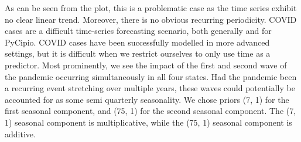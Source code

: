 \documentclass{article}
\begin{document}
\noindent As can be seen from the plot, this is a problematic case as the time series exhibit no clear linear trend. Moreover, there is no obvious recurring periodicity. COVID cases are a difficult time-series forecasting scenario, both generally and for PyCipio. COVID cases have been successfully modelled in more advanced settings, but it is difficult when we restrict ourselves to only use time as a predictor. Most prominently, we see the impact of the first and second wave of the pandemic occurring simultaneously in all four states. Had the pandemic been a recurring event stretching over multiple years, these waves could potentially be accounted for as some semi quarterly seasonality. We chose priors (7, 1) for the first seasonal component, and (75, 1) for the second seasonal component. The (7, 1) seasonal component is multiplicative, while the (75, 1) seasonal component is additive. 
\end{document}
